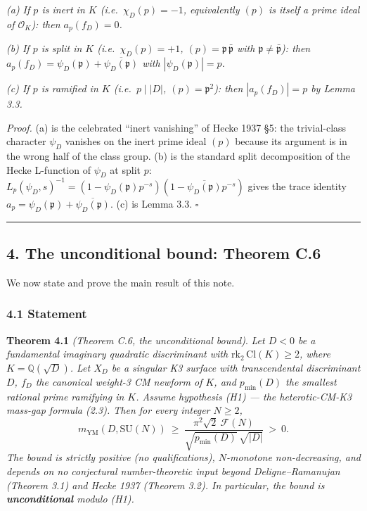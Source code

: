 \documentclass[
  11pt,
  a4paper,
]{amsart}
\begin{document}
\emph{(a) If \(p\) is inert in \(K\) (i.e.~\(\chi_D(p) = -1\), equivalently \((p)\) is itself a prime ideal of \(\mathcal{O}_K\)): then \(a_p(f_D) = 0\).}

\emph{(b) If \(p\) is split in \(K\) (i.e.~\(\chi_D(p) = +1\), \((p) = \mathfrak{p}\,\bar{\mathfrak{p}}\) with \(\mathfrak{p} \ne \bar{\mathfrak{p}}\)): then \(a_p(f_D) = \psi_D(\mathfrak{p}) + \overline{\psi_D(\mathfrak{p})}\) with \(|\psi_D(\mathfrak{p})| = p\).}

\emph{(c) If \(p\) is ramified in \(K\) (i.e.~\(p \mid |D|\), \((p) = \mathfrak{p}^2\)): then \(|a_p(f_D)| = p\) by Lemma 3.3.}

\emph{Proof.} (a) is the celebrated ``inert vanishing'' of Hecke 1937 §5: the trivial-class character \(\psi_D\) vanishes on the inert prime ideal \((p)\) because its argument is in the wrong half of the class group. (b) is the standard split decomposition of the Hecke L-function of \(\psi_D\) at split \(p\): \(L_p(\psi_D, s)^{-1} = (1 - \psi_D(\mathfrak{p}) p^{-s})(1 - \overline{\psi_D(\mathfrak{p})} p^{-s})\) gives the trace identity \(a_p = \psi_D(\mathfrak{p}) + \overline{\psi_D(\mathfrak{p})}\). (c) is Lemma 3.3. \(\square\)

\begin{center}\rule{0.5\linewidth}{0.5pt}\end{center}

\hypertarget{the-unconditional-bound-theorem-c.6}{%
\subsection{4. The unconditional bound: Theorem C.6}\label{the-unconditional-bound-theorem-c.6}}

We now state and prove the main result of this note.

\hypertarget{statement}{%
\subsubsection{4.1 Statement}\label{statement}}

\textbf{Theorem 4.1} \emph{(Theorem C.6, the unconditional bound)}. \emph{Let \(D < 0\) be a fundamental imaginary quadratic discriminant with \(\mathrm{rk}_2\, \mathrm{Cl}(K) \ge 2\), where \(K = \mathbb{Q}(\sqrt{D})\). Let \(X_D\) be a singular K3 surface with transcendental discriminant \(D\), \(f_D\) the canonical weight-3 CM newform of \(K\), and \(p_{\min}(D)\) the smallest rational prime ramifying in \(K\). Assume hypothesis (H1) --- the heterotic-CM-K3 mass-gap formula (2.3). Then for every integer \(N \ge 2\),}
\[
m_{\mathrm{YM}}(D, \mathrm{SU}(N))\ \ge\ \frac{\pi^2 \sqrt{2}\ \mathcal{F}(N)}{\sqrt{p_{\min}(D)}\,\sqrt{|D|}}\ >\ 0.
\tag{4.1}
\]
\emph{The bound is strictly positive (no qualifications), \(N\)-monotone non-decreasing, and depends on no conjectural number-theoretic input beyond Deligne--Ramanujan (Theorem 3.1) and Hecke 1937 (Theorem 3.2). In particular, the bound is \textbf{unconditional} modulo (H1).}
\end{document}
